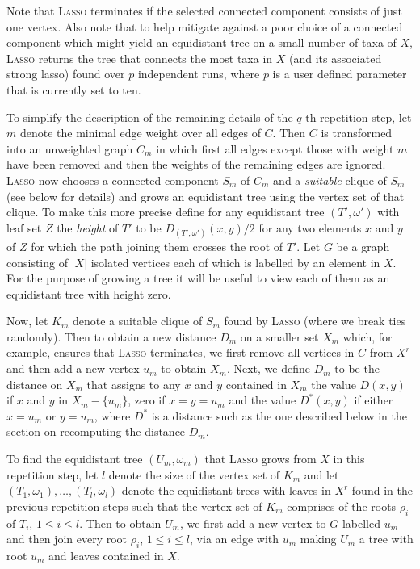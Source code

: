 Note that \textsc{Lasso} terminates if the selected connected component consists
of just one vertex.  Also note that to help mitigate against a poor choice of
a connected component which might yield an equidistant tree on a small number
of taxa of $X$, \textsc{Lasso} returns the tree that connects the most taxa in
$X$ (and its associated strong lasso) found over $p$ independent runs, where
$p$ is a user defined parameter that is currently set to ten.

To simplify the description of the remaining details of the $q$-th repetition
step, let $m$ denote the minimal edge weight over all edges of $C$. Then $C$
is transformed into an unweighted graph $C_m$ in which first all edges except
those with weight $m$ have been removed and then the weights of the remaining
edges are ignored. \textsc{Lasso} now chooses a connected component $S_m$ of
$C_m$ and a {\em suitable} clique of $S_m$ (see below for details) and grows
an equidistant tree using the vertex set of that clique. To make this more
precise define for any equidistant tree $(T',\omega')$ with leaf set $Z$ the
{\em height} of $T'$ to be $D_{(T',\omega')}(x,y)/2$ for any two elements $x$
and $y$ of $Z$ for which the path joining them crosses the root of $T'$.  Let
$G$ be a graph consisting of $|X|$ isolated vertices each of which is labelled
by an element in $X$. For the purpose of growing a tree it will be useful to
view each of them as an equidistant tree with height zero.

Now, let $K_m$ denote a suitable clique of $S_m$ found by \textsc{Lasso} (where
we break ties randomly).  Then to obtain a new distance $D_m$ on a smaller set
$X_m$ which, for example, ensures that \textsc{Lasso} terminates, we first remove
all vertices in $C$ from $X^r$ and then add a new vertex $u_m$ to obtain
$X_m$. Next, we define $D_m$ to be the distance on $X_m$ that assigns to any
$x$ and $y$ contained in $X_m$ the value $D(x,y)$ if $x$ and $y$ in
$X_m-\{u_m\}$, zero if $x=y=u_m$ and the value $D^*(x,y)$ if either $x=u_m$ or
$y=u_m$, where $D^*$ is a distance such as the one described below in the
section on recomputing the distance $D_m$.

To find the equidistant tree $(U_m,\omega_m) $ that \textsc{Lasso} grows from $X$
in this repetition step, let $l$ denote the size of the vertex set of $K_m$
and let $(T_1,\omega_1),\ldots, (T_l,\omega_l)$ denote the equidistant trees
with leaves in $X^r$ found in the previous repetition steps such that the
vertex set of $K_m$ comprises of the roots $\rho_i$ of $T_i$, $1\leq i\leq
l$. Then to obtain $U_m$, we first add a new vertex to $G$ labelled $u_m$ and
then join every root $\rho_i$, $1\leq i\leq l$, via an edge with $u_m$ making
$U_m$ a tree with root $u_m$ and leaves contained in $X$.


